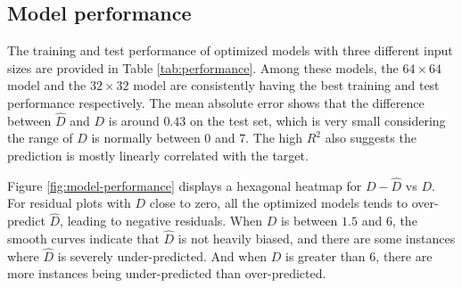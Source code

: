 \documentclass[]{interact}
\theoremstyle{plain}%
\theoremstyle{definition}
\theoremstyle{remark}
\begin{document}
\begin{table}

\caption{\label{tab:best-hyperparameter}Hyperparameters values for the optimized computer vision models with different input sizes.}
\centering
{}
\end{table}

\hypertarget{model-performance}{%
\subsection{Model performance}\label{model-performance}}

The training and test performance of optimized models with three
different input sizes are provided in Table \ref{tab:performance}. Among
these models, the \(64 \times 64\) model and the \(32 \times 32\) model
are consistently having the best training and test performance
respectively. The mean absolute error shows that the difference between
\(\hat{D}\) and \(D\) is around \(0.43\) on the test set, which is very
small considering the range of \(D\) is normally between \(0\) and
\(7\). The high \(R^2\) also suggests the prediction is mostly linearly
correlated with the target.

Figure \ref{fig:model-performance} displays a hexagonal heatmap for
\(D - \hat{D}\) vs \(D\). For residual plots with \(D\) close to zero,
all the optimized models tends to over-predict \(\hat{D}\), leading to
negative residuals. When \(D\) is between \(1.5\) and \(6\), the smooth
curves indicate that \(\hat{D}\) is not heavily biased, and there are
some instances where \(\hat{D}\) is severely under-predicted. And when
\(D\) is greater than \(6\), there are more instances being
under-predicted than over-predicted.
\end{document}
